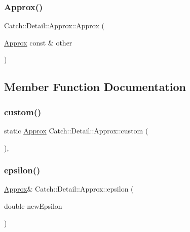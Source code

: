 \subsubsection{\texorpdfstring{Approx()}{Approx()}\hspace{0.1cm}{\footnotesize\ttfamily [2/2]}}
{\footnotesize\ttfamily Catch\+::\+Detail\+::\+Approx\+::\+Approx (\begin{DoxyParamCaption}\item[{\hyperlink{class_catch_1_1_detail_1_1_approx}{Approx} const \&}]{other }\end{DoxyParamCaption})\hspace{0.3cm}{\ttfamily [inline]}}



\subsection{Member Function Documentation}
\hypertarget{class_catch_1_1_detail_1_1_approx_aaf86dc0ee92272ac2d9839197a07951d}{}\label{class_catch_1_1_detail_1_1_approx_aaf86dc0ee92272ac2d9839197a07951d} 
\subsubsection{\texorpdfstring{custom()}{custom()}}
{\footnotesize\ttfamily static \hyperlink{class_catch_1_1_detail_1_1_approx}{Approx} Catch\+::\+Detail\+::\+Approx\+::custom (\begin{DoxyParamCaption}{ }\end{DoxyParamCaption})\hspace{0.3cm}{\ttfamily [inline]}, {\ttfamily [static]}}

\hypertarget{class_catch_1_1_detail_1_1_approx_a05c50c3ad0a971fab19345b5d94979a9}{}\label{class_catch_1_1_detail_1_1_approx_a05c50c3ad0a971fab19345b5d94979a9} 
\subsubsection{\texorpdfstring{epsilon()}{epsilon()}}
{\footnotesize\ttfamily \hyperlink{class_catch_1_1_detail_1_1_approx}{Approx}\& Catch\+::\+Detail\+::\+Approx\+::epsilon (\begin{DoxyParamCaption}\item[{double}]{new\+Epsilon }\end{DoxyParamCaption})\hspace{0.3cm}{\ttfamily [inline]}}

